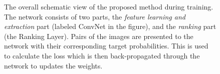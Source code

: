 \begin{figure}
{}
\caption{The overall schematic view of the proposed method during training. The network consists of two parts, the \textit{feature learning and extraction} part (labeled ConvNet in the figure), and the \textit{ranking} part (the Ranking Layer). Pairs of the images are presented to the network with their corresponding target probabilities. This is used to calculate the loss which is then back-propagated through the network to updates the weights.}
\label{fig.3}
\end{figure}

